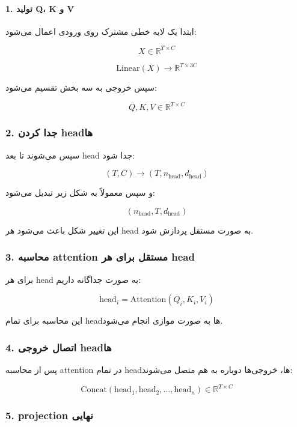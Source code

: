 \documentclass{article}
\begin{document}
\paragraph{1. تولید Q، K و V}

ابتدا یک لایه خطی مشترک روی ورودی اعمال می‌شود:

\[
X \in \mathbb{R}^{T \times C}
\]

\[
\text{Linear}(X) \rightarrow \mathbb{R}^{T \times 3C}
\]

سپس خروجی به سه بخش تقسیم می‌شود:

\[
Q, K, V \in \mathbb{R}^{T \times C}
\]

\subsubsection*{2. جدا کردن headها}

سپس   می‌شوند تا بعد head جدا شود:

\[
(T, C) \rightarrow (T, n_{\text{head}}, d_{\text{head}})
\]

و سپس معمولاً به شکل زیر تبدیل می‌شود:

\[
(n_{\text{head}}, T, d_{\text{head}})
\]

این تغییر شکل باعث می‌شود هر head به صورت مستقل پردازش شود.

\subsubsection*{3. محاسبه attention مستقل برای هر head}

برای هر head به صورت جداگانه داریم:

\[
\text{head}_i =
\text{Attention}(Q_i, K_i, V_i)
\]

این محاسبه برای تمام headها به صورت موازی انجام می‌شود.

\subsubsection*{4. اتصال خروجی headها}

پس از محاسبه attention در تمام headها، خروجی‌ها دوباره به هم متصل می‌شوند:

\[
\text{Concat}(\text{head}_1, \text{head}_2, \dots, \text{head}_n)
\in \mathbb{R}^{T \times C}
\]

\subsubsection*{5. projection نهایی}
\end{document}
